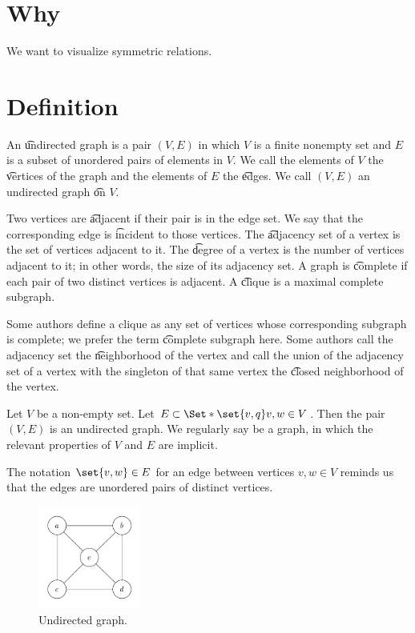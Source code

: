 
\section{Why}

We want to visualize symmetric relations.

\section{Definition}

An \t{undirected graph} is a pair $(V, E)$ in which $V$ is a finite nonempty set and $E$ is a subset of unordered pairs of elements in $V$.
We call the elements of $V$ the \t{vertices} of the graph and the elements of $E$ the \t{edges}.
We call $(V, E)$ an undirected graph \t{on} $V$.

Two vertices are \t{adjacent} if their pair is in the edge set.
We say that the corresponding edge is \t{incident} to those vertices.
The \t{adjacency set} of a vertex is the set of vertices adjacent to it.
The \t{degree} of a vertex is the number of vertices adjacent to it; in other words, the size of its adjacency set.
A graph is \t{complete} if each pair of two distinct vertices is adjacent.
A \t{clique} is a maximal complete subgraph.


Some authors define a clique as any set of vertices whose corresponding subgraph is complete; we prefer the term \t{complete subgraph} here.
Some authors call the adjacency set the \t{neighborhood} of the vertex and call the union of the adjacency set of a vertex with the singleton of that same vertex the \t{closed neighborhood} of the vertex.


Let $V$ be a non-empty set.
Let $E \subset \Set*{\set{v, q}}{v, w \in V}$.
Then the pair $(V, E)$ is an undirected graph.
We regularly say  be a graph, in which the relevant properties of $V$ and $E$ are implicit.

The notation $\set{v, w} \in E$ for an edge between vertices $v, w \in V$ reminds us that the edges are unordered pairs of distinct vertices.


\begin{figure}
  \centering
  \includegraphics[width=0.3\textwidth]{graphics_included/undirected_graph}
  \caption{Undirected graph.}
\end{figure}

